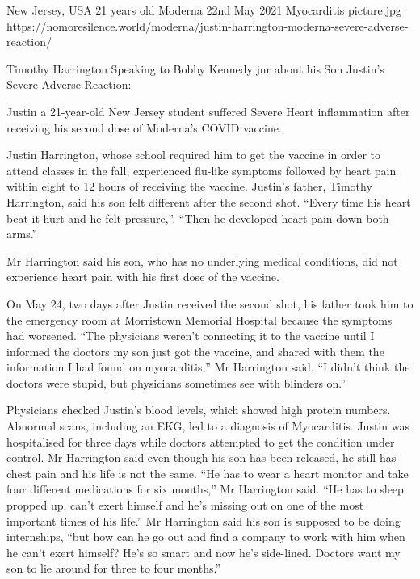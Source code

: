 {New Jersey, USA}
{21 years old}
{Moderna}
{22nd May 2021}
{Myocarditis}
{picture.jpg}
{https://nomoresilence.world/moderna/justin-harrington-moderna-severe-adverse-reaction/}
{

\normalsize

Timothy Harrington Speaking to Bobby Kennedy jnr about his Son Justin’s Severe
Adverse Reaction:

Justin a 21-year-old New Jersey student suffered Severe Heart inflammation after
receiving his second dose of Moderna’s COVID vaccine.

Justin Harrington, whose school required him to get the vaccine in order to
attend classes in the fall, experienced flu-like symptoms followed by heart pain
within eight to 12 hours of receiving the vaccine. Justin’s father, Timothy
Harrington, said his son felt different after the second shot. “Every time his
heart beat it hurt and he felt pressure,”. “Then he developed heart pain down
both arms.”

Mr Harrington said his son, who has no underlying medical conditions, did not
experience heart pain with his first dose of the vaccine.

On May 24, two days after Justin received the second shot, his father took him
to the emergency room at Morristown Memorial Hospital because the symptoms had
worsened. “The physicians weren’t connecting it to the vaccine until I informed
the doctors my son just got the vaccine, and shared with them the information I
had found on myocarditis,” Mr Harrington said. “I didn’t think the doctors were
stupid, but physicians sometimes see with blinders on.”

Physicians checked Justin’s blood levels, which showed high protein
numbers. Abnormal scans, including an EKG, led to a diagnosis of
Myocarditis. Justin was hospitalised for three days while doctors attempted to
get the condition under control. Mr Harrington said even though his son has been
released, he still has chest pain and his life is not the same. “He has to wear
a heart monitor and take four different medications for six months,” Mr
Harrington said. “He has to sleep propped up, can’t exert himself and he’s
missing out on one of the most important times of his life.” Mr Harrington said
his son is supposed to be doing internships, “but how can he go out and find a
company to work with him when he can’t exert himself? He’s so smart and now he’s
side-lined. Doctors want my son to lie around for three to four months.”

}
